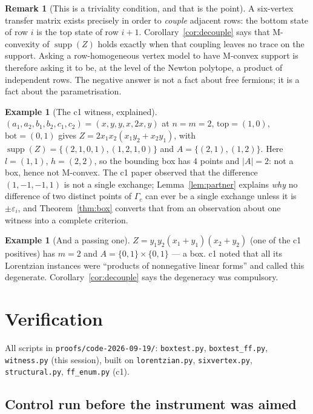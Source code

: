 \documentclass[11pt]{article}
\theoremstyle{definition}
\newtheorem{remark}[theorem]{Remark}
\newtheorem{example}[theorem]{Example}
\newcommand{\supp}{\operatorname{supp}}
\begin{document}
\begin{remark}[This is a triviality condition, and that is the point]
A six-vertex transfer matrix exists precisely in order to \emph{couple} adjacent rows: the
bottom state of row $i$ is the top state of row $i+1$. Corollary~\ref{cor:decouple} says
that M-convexity of $\supp(Z)$ holds exactly when that coupling leaves no trace on the
support. Asking a row-homogeneous vertex model to have M-convex support is therefore asking
it to be, at the level of the Newton polytope, a product of independent rows. The negative
answer is not a fact about free fermions; it is a fact about the parametrisation.
\end{remark}

\begin{example}[The c1 witness, explained]
$(a_1,a_2,b_1,b_2,c_1,c_2)=(x,y,y,x,2x,y)$ at $n=m=2$, $\mathrm{top}=(1,0)$,
$\mathrm{bot}=(0,1)$ gives $Z=2x_1x_2(x_1y_2+x_2y_1)$, with
$\supp(Z)=\{(2,1,0,1),(1,2,1,0)\}$ and $A=\{(2,1),(1,2)\}$. Here $l=(1,1)$, $h=(2,2)$, so
the bounding box has $4$ points and $|A|=2$: not a box, hence not M-convex. The c1 paper
observed that the difference $(1,-1,-1,1)$ is not a single exchange; Lemma~\ref{lem:partner}
explains \emph{why} no difference of two distinct points of $\Gamma_c$ can ever be a single
exchange unless it is $\pm\varepsilon_i$, and Theorem~\ref{thm:box} converts that from an
observation about one witness into a complete criterion.
\end{example}

\begin{example}[And a passing one]
$Z=y_1y_2(x_1+y_1)(x_2+y_2)$ (one of the c1 positives) has $m=2$ and
$A=\{0,1\}\times\{0,1\}$ --- a box. c1 noted that all its Lorentzian instances were
``products of nonnegative linear forms'' and called this degenerate.
Corollary~\ref{cor:decouple} says the degeneracy was compulsory.
\end{example}

\section{Verification}

All scripts in \texttt{proofs/code-2026-09-19/}: \texttt{boxtest.py},
\texttt{boxtest\_ff.py}, \texttt{witness.py} (this session), built on
\texttt{lorentzian.py}, \texttt{sixvertex.py}, \texttt{structural.py}, \texttt{ff\_enum.py}
(c1).

\subsection*{Control run before the instrument was aimed}
\end{document}
